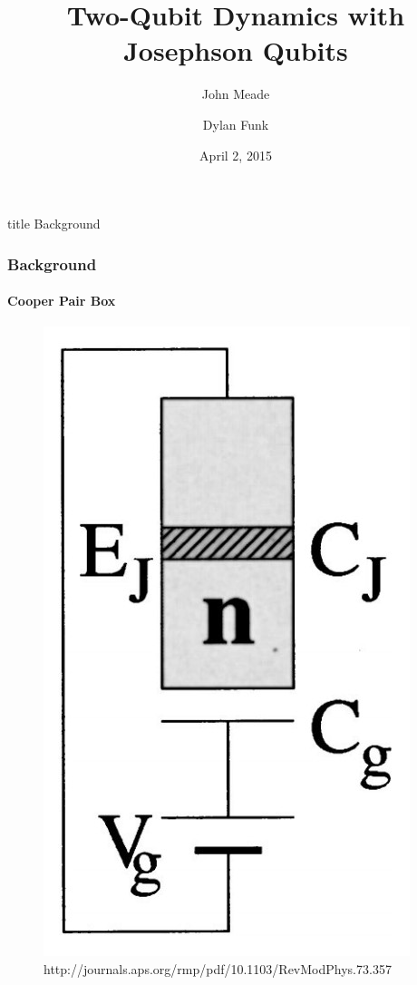 \documentclass{beamer}
\title{Two-Qubit Dynamics with Josephson Qubits}
\author{John Meade \and Dylan Funk}
\date{April 2, 2015}
\begin{document}
\begin{frame}
\titlepage
\end{frame}


\begin{frame}
    \vfill
    \centering
    \begin{beamercolorbox}[sep=8pt,center,shadow=true,rounded=true]{title}
        Background
    \end{beamercolorbox}
    \vfill
\end{frame}


\begin{frame}
    \frametitle{Background}
    \framesubtitle{Cooper Pair Box}
    \begin{figure}[ht!]
        \centering
        \includegraphics[height=0.6\textheight]{img/cooper-pair-box.jpg}
        \caption{http://journals.aps.org/rmp/pdf/10.1103/RevModPhys.73.357}
    \end{figure}
\end{frame}
\end{document}
